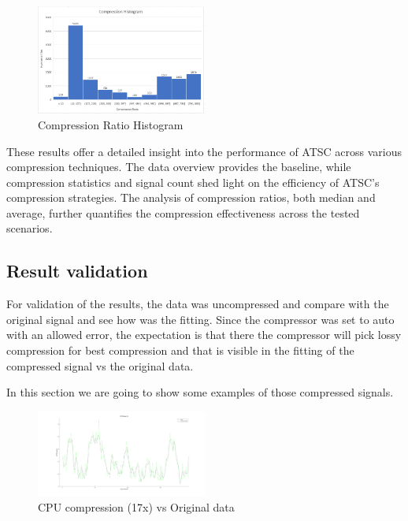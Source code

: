 \documentclass[conference]{IEEEtran}
\begin{document}


\begin{figure}[h]
  \centering
  \includegraphics[width=0.5\textwidth]{Fig5.png}
  \caption{Compression Ratio Histogram}
  \label{Fig.6}
\end{figure}

\vspace{10pt}
These results offer a detailed insight into the performance of ATSC across various compression techniques. The data overview provides the baseline, while compression statistics and signal count shed light on the efficiency of ATSC's compression strategies. The analysis of compression ratios, both median and average, further quantifies the compression effectiveness across the tested scenarios. 
 
\subsection{Result validation}

For validation of the results, the data was uncompressed and compare with the original signal and see how was the fitting. Since the compressor was set to auto with an allowed error, the expectation is that there the compressor will pick lossy compression for best compression and that is visible in the fitting of the compressed signal vs the original data.

In this section we are going to show some examples of those compressed signals.

\begin{figure}[h]
  \centering
  \includegraphics[width=0.5\textwidth]{cpu-usage-validation.png}
  \caption{CPU compression (17x) vs Original data}
  \label{cpu}
\end{figure}
\end{document}
